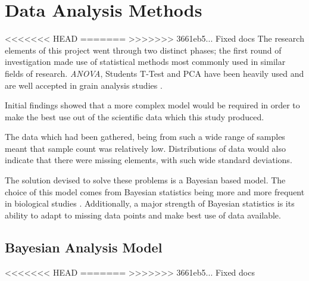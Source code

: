 \documentclass[11pt]{report}
\begin{document}
\begin{listing}[htbp]
\begin{verbatim}
def facet_hist(self, df, column, group_by):
    col_wrap = len(df[group_by].unique()) // 2
    if col_wrap < 4:
        col_wrap = None
    g = sns.FacetGrid(df, hue=group_by, col=group_by,
                      col_wrap=col_wrap)
    g = g.map(sns.distplot, column, kde=False,
              hist_kws=dict(edgecolor="k", linewidth=2))
    g.fig.tight_layout()
    return g.fig
\end{verbatim}
<<<<<<< HEAD
\caption{\label{org47b21a8}
=======
\caption{\label{org789cd70}
>>>>>>> 3661eb5... Fixed docs
Using Facet wrapping to provide}
\end{listing}

\section{Data Analysis Methods}
<<<<<<< HEAD
\label{sec:org43bc5c4}
=======
\label{sec:orgad55bee}
>>>>>>> 3661eb5... Fixed docs
The research elements of this project went through two distinct phases; the first round of investigation made use of statistical methods most commonly used in similar fields of research. \emph{ANOVA}, Students T-Test and PCA have been heavily used and are well accepted in grain analysis studies \cite{Gegas2010,Hughes2017,Xie2015}.

Initial findings showed that a more complex model would be required in order to make the best use out of the scientific data which this study produced.

The data which had been gathered, being from such a wide range of samples meant that sample count was relatively low. Distributions of data would also indicate that there were missing elements, with such wide standard deviations.

The solution devised to solve these problems is a Bayesian based model. The choice of this model comes from Bayesian statistics being more and more frequent in biological studies \cite{Kruschke2012,Pullen2014}. Additionally, a major strength of Bayesian statistics is its ability to adapt to missing data points and make best use of data available.

\subsection{Bayesian Analysis Model}
<<<<<<< HEAD
\label{sec:org710916a}
=======
\label{sec:org1055fc9}
>>>>>>> 3661eb5... Fixed docs
\end{document}
